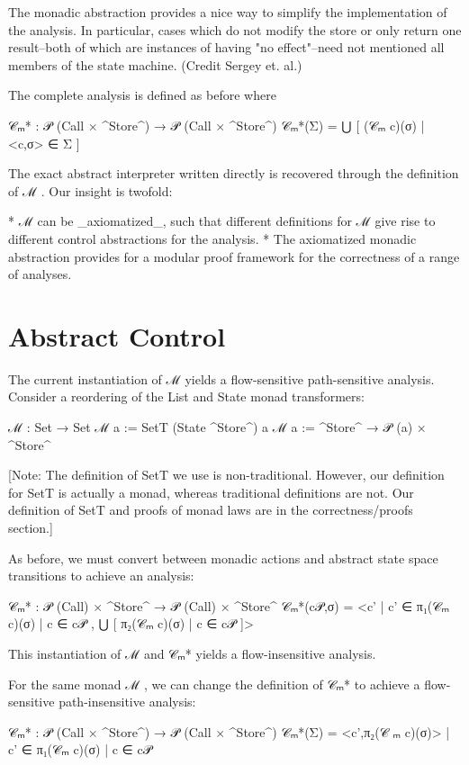 \documentclass{article}
\begin{document}
The monadic abstraction provides a nice way to simplify the implementation of
the analysis.  In particular, cases which do not modify the store or only
return one result--both of which are instances of having "no effect"--need not
mentioned all members of the state machine.  (Credit Sergey et. al.)

The complete analysis is defined as before where

𝒞ₘ* : 𝒫 (Call × ^Store^) → 𝒫 (Call × ^Store^)
𝒞ₘ*(Σ) = ⋃ [ (𝒞ₘ c)(σ) | <c,σ> ∈ Σ ]

The exact abstract interpreter written directly is recovered through the
definition of ℳ .  Our insight is twofold:

* ℳ  can be _axiomatized_, such that different definitions for ℳ  give rise to
  different control abstractions for the analysis.
* The axiomatized monadic abstraction provides for a modular proof framework
  for the correctness of a range of analyses.



\section{Abstract Control}
\label{section:AbstractControl}

The current instantiation of ℳ  yields a flow-sensitive path-sensitive
analysis.  Consider a reordering of the List and State monad transformers:

ℳ  : Set → Set
ℳ  a := SetT (State ^Store^) a
ℳ  a := ^Store^ → 𝒫 (a) × ^Store^

[Note: The definition of SetT we use is non-traditional.  However, our
definition for SetT is actually a monad, whereas traditional definitions are
not.  Our definition of SetT and proofs of monad laws are in the
correctness/proofs section.]

As before, we must convert between monadic actions and abstract state space
transitions to achieve an analysis:

𝒞ₘ* : 𝒫 (Call) × ^Store^ → 𝒫 (Call) × ^Store^
𝒞ₘ*(c𝒫,σ) = <{c' | c' ∈ π₁(𝒞ₘ c)(σ) | c ∈ c𝒫 }, ⋃ [ π₂(𝒞ₘ c)(σ) | c ∈ c𝒫 ]>

This instantiation of ℳ  and 𝒞ₘ* yields a flow-insensitive analysis.

For the same monad ℳ , we can change the definition of 𝒞ₘ* to achieve a
flow-sensitive path-insensitive analysis:

𝒞ₘ* : 𝒫 (Call × ^Store^) → 𝒫 (Call × ^Store^)
𝒞ₘ*(Σ) = { <c',π₂(𝒞 ₘ c)(σ)> | c' ∈ π₁(𝒞ₘ c)(σ) | c ∈ c𝒫 }
\end{document}
